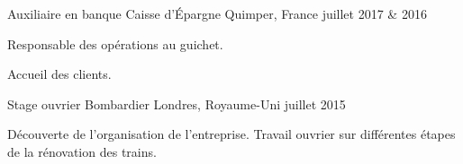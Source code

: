 

\begin{cventries}

  \cventry
    {Auxiliaire en banque} %
    {Caisse d'Épargne} %
    {Quimper, France} %
    {juillet 2017 \& 2016} %
    {
      \begin{cvitems} %
        \item {Responsable des opérations au guichet.}
        \item {Accueil des clients.}
      \end{cvitems}
    } 

  \cventry
    {Stage ouvrier} %
    {Bombardier} %
    {Londres, Royaume-Uni} %
    {juillet 2015} %
    {
      \begin{cvitems} %
        \item {Découverte de l'organisation de l'entreprise. Travail ouvrier sur différentes étapes de la rénovation des trains.}
      \end{cvitems}
    }


\end{cventries}
